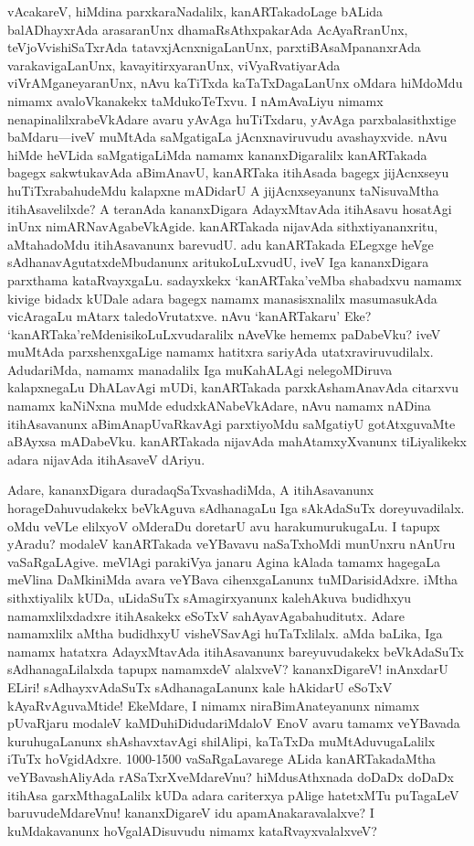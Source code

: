 \documentclass[11pt,a4size]{article}
\begin{document}
vAcakareV, hiMdina parxka\-raNa\-dalilx, kanARTaka\-doLage bALida
balADhayx\-rAda arasa\-ranUnx dhamaRsAthxpakarAda AcAyaRranUnx,
teVjoVvishiSaTxrAda tatavxjAcnxnigaLanUnx, parxtiBAsaMpananxrAda
varakavigaLanUnx, kavayitirxyaranUnx, viVyaRvatiyarAda
viVrAMganeyaranUnx, nAvu kaTiTxda kaTaTxDagaLanUnx oMdara hiMdoMdu
nimamx avaloVkanakekx taMdukoTeTxvu. I nAmAvaLiyu nimamx
nenapinalilxrabeVkAdare avaru yAvAga huTiTxdaru, yAvAga
parxbalasithxtige baMdaru---iveV muMtAda saMgatigaLa jAcnxnaviruvudu
avashayxvide. nAvu hiMde heVLida saMgatigaLiMda namamx
kananxDigaralilx kanARTakada bagegx sakwtukavAda aBimAnavU, kanARTaka
itihAsada bagegx jijAcnxseyu huTiTxrabahudeMdu kalapxne mADidarU A
jijAcnxseyanunx taNisuvaMtha itihAsavelilxde? A teranAda kananxDigara
AdayxMtavAda itihAsavu hosatAgi inUnx
nimARNavAgabeVkAgide. kanARTakada nijavAda sithxtiyananxritu,
aMtahadoMdu itihAsavanunx barevudU. adu kanARTakada ELegxge heVge
sAdhanavAgutatxdeMbudanunx aritukoLuLxvudU, iveV Iga kananxDigara
parxthama kataRvayxgaLu. sadayxkekx `kanARTaka'veMba shabadxvu namamx
kivige bidadx kUDale adara bagegx namamx manasisxnalilx masumasukAda
vicAragaLu mAtarx taledoVrutatxve. nAvu `kanARTakaru' Eke?
`kanARTaka'reMdenisikoLuLxvudaralilx nAveVke hememx paDabeVku? iveV
muMtAda parxshenxgaLige namamx hatitxra sariyAda
utatxraviruvudilalx. AdudariMda, namamx manadalilx Iga muKahALAgi
nelegoMDiruva kalapxnegaLu DhALavAgi mUDi, kanARTakada
parxkAshamAnavAda citarxvu namamx kaNiNxna muMde edudxkANabeVkAdare,
nAvu namamx nADina itihAsavanunx aBimAnapUvaRkavAgi parxtiyoMdu
saMgatiyU gotAtxguvaMte aBAyxsa mADabeVku. kanARTakada nijavAda
mahAtamxyXvanunx tiLiyalikekx adara nijavAda itihAsaveV dAriyu.

Adare, kananxDigara duradaqSaTxvashadiMda, A itihAsavanunx
horageDahuvudakekx beVkAguva sAdhanagaLu Iga sAkAdaSuTx
doreyuvadilalx. oMdu veVLe elilxyoV oMderaDu doretarU avu
harakumurukugaLu. I tapupx yAradu? modaleV kanARTakada veYBavavu
naSaTxhoMdi munUnxru nAnUru vaSaRgaLAgive. meVlAgi parakiVya janaru
Agina kAlada tamamx hagegaLa meVlina DaMkiniMda avara veYBava
cihenxgaLanunx tuMDarisidAdxre. iMtha sithxtiyalilx kUDa, uLidaSuTx
sAmagirxyanunx kalehAkuva budidhxyu namamxlilxdadxre itihAsakekx
eSoTxV sahAyavAgabahuditutx. Adare namamxlilx aMtha budidhxyU
visheVSavAgi huTaTxlilalx. aMda baLika, Iga namamx hatatxra
AdayxMtavAda itihAsavanunx bareyuvudakekx beVkAdaSuTx
sAdhanagaLilalxda tapupx namamxdeV alalxveV? kananxDigareV! inAnxdarU
ELiri! sAdhayxvAdaSuTx sAdhanagaLanunx kale hAkidarU eSoTxV
kAyaRvAguvaMtide! EkeMdare, I nimamx niraBimAnateyanunx nimamx
pUvaRjaru modaleV kaMDuhiDidudariMdaloV EnoV avaru tamamx veYBavada
kuruhugaLanunx shAshavxtavAgi shilAlipi, kaTaTxDa muMtAduvugaLalilx
iTuTx hoVgidAdxre. 1000-1500 vaSaRgaLavarege ALida kanARTakadaMtha
veYBavashAliyAda rASaTxrXveMdareVnu? hiMdusAthxnada doDaDx doDaDx
itihAsa garxMthagaLalilx kUDa adara cariterxya pAlige hatetxMTu
puTagaLeV baruvudeMdareVnu! kananxDigareV idu apamAnakaravalalxve? I
kuMdakavanunx hoVgalADisuvudu nimamx kataRvayxvalalxveV?
\end{document}

